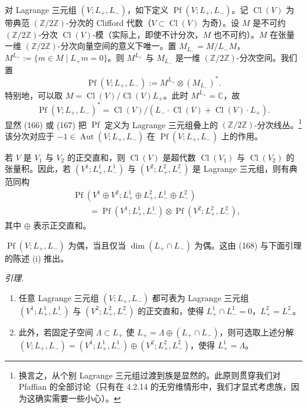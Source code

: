  对 Lagrange 三元组 $(V;L_{+},L_{-})$，如下定义 $\operatorname{Pf}(V;L_{+},L_{-})$。记 $\operatorname{Cl}(V)$ 为带典范 $(\mathbb{Z}/2\mathbb{Z})$-分次的 Clifford 代数（$V\subset\operatorname{Cl}(V)$ 为奇）。设 $M$ 是不可约 $(\mathbb{Z}/2\mathbb{Z})$-分次 $\operatorname{Cl}(V)$-模（实际上，即使不计分次，$M$ 也不可约）。$M$ 在张量一维 $(\mathbb{Z}/2\mathbb{Z})$-分次向量空间的意义下唯一。置 $M_{L_{-}}=M/L_{-}M$，$M^{L_{+}}:=\{m\in M\mid L_{+}m=0\}$。则 $M^{L_{+}}$ 与 $M_{L_{-}}$ 是一维 $(\mathbb{Z}/2\mathbb{Z})$-分次空间。我们置
\begin{equation}\tag{166}
\operatorname{Pf}(V;L_{+},L_{-}):=M^{L_{+}}\otimes(M_{L_{-}})^{*}.
\end{equation}
特别地，可以取 $M=\operatorname{Cl}(V)/\operatorname{Cl}(V)L_{+}$。此时 $M^{L_{+}}=\mathbb{C}$，故
\begin{equation}\tag{167}
\operatorname{Pf}(V;L_{+},L_{-})^{*}=\operatorname{Cl}(V)/(L_{-}\cdot\operatorname{Cl}(V)+\operatorname{Cl}(V)\cdot L_{+}).
\end{equation}
显然 (166) 或 (167) 把 $\operatorname{Pf}$ 定义为 Lagrange 三元组叠上的 $(\mathbb{Z}/2\mathbb{Z})$-分次线丛。\footnote{换言之，从个别 Lagrange 三元组过渡到族是显然的。此原则贯穿我们对 Pfaffian 的全部讨论（只有在 4.2.14 的无穷维情形中，我们才显式考虑族，因为这确实需要一些小心）。} 该分次对应于 $-1\in\operatorname{Aut}(V;L_{+},L_{-})$ 在 $\operatorname{Pf}(V;L_{+},L_{-})$ 上的作用。

若 $V$ 是 $V_{1}$ 与 $V_{2}$ 的正交直和，则 $\operatorname{Cl}(V)$ 是超代数 $\operatorname{Cl}(V_{1})$ 与 $\operatorname{Cl}(V_{2})$ 的张量积。因此，若 $(V^{1};L^{1}_{+},L^{1}_{-})$ 与 $(V^{2};L^{2}_{+},L^{2}_{-})$ 是 Lagrange 三元组，则有典范同构
\begin{equation}\tag{168}
\begin{aligned}
&\operatorname{Pf}(V^{1}\oplus V^{2};L^{1}_{+}\oplus L^{2}_{+},L^{1}_{-}\oplus L^{2}_{-})\\
&\qquad=\operatorname{Pf}(V^{1};L^{1}_{+},L^{1}_{-})\otimes\operatorname{Pf}(V^{2};L^{2}_{+},L^{2}_{-}),
\end{aligned}
\end{equation}
其中 $\oplus$ 表示正交直和。

$\operatorname{Pf}(V;L_{+},L_{-})$ 为偶，当且仅当 $\dim(L_{+}\cap L_{-})$ 为偶。这由 (168) 与下面引理的陈述 (i) 推出。

 \emph{引理.}
\begin{enumerate}[label=(\roman*),leftmargin=2.2em]
\item 任意 Lagrange 三元组 $(V;L_{+},L_{-})$ 都可表为 Lagrange 三元组 $(V^{1};L^{1}_{+},L^{1}_{-})$ 与 $(V^{2};L^{2}_{+},L^{2}_{-})$ 的正交直和，使得 $L^{1}_{+}\cap L^{1}_{-}=0$，$L^{2}_{+}=L^{2}_{-}$。
\item 此外，若固定子空间 $\Lambda\subset L_{+}$ 使 $L_{+}=\Lambda\oplus(L_{+}\cap L_{-})$，则可选取上述分解 $(V;L_{+},L_{-})=(V^{1};L^{1}_{+},L^{1}_{-})\oplus(V^{2};L^{2}_{+},L^{2}_{-})$，使得 $L^{1}_{+}=\Lambda$。
\end{enumerate}

